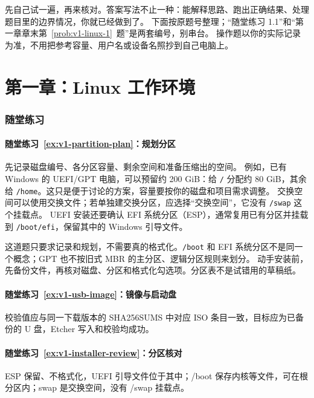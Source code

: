 \begingroup
\setlength{\emergencystretch}{3em}

先自己试一遍，再来核对。答案写法不止一种：能解释思路、跑出正确结果、处理题目里的边界情况，你就已经做到了。
下面按原题号整理；“随堂练习 1.1”和“第一章章末第~\ref{prob:v1-linux-1}~题”是两套编号，别串台。
操作题以你的实际记录为准，不用把参考容量、用户名或设备名照抄到自己电脑上。

\section*{第一章：Linux 工作环境}
{}
\subsubsection*{随堂练习}

\paragraph*{随堂练习~\ref{ex:v1-partition-plan}：规划分区}
\begin{solution}
先记录磁盘编号、各分区容量、剩余空间和准备压缩出的空间。
例如，已有 Windows 的 UEFI/GPT 电脑，可以预留约 200 GiB：给 \texttt{/} 分配约 80 GiB，其余给 \texttt{/home}。这只是便于讨论的方案，容量要按你的磁盘和项目需求调整。
交换空间可以使用交换文件；若单独建交换分区，应选择“交换空间”，它没有 \texttt{/swap} 这个挂载点。
UEFI 安装还要确认 EFI 系统分区（ESP），通常复用已有分区并挂载到 \texttt{/boot/efi}，保留其中的 Windows 引导文件。
\begin{note}
这道题只要求记录和规划，不需要真的格式化。\texttt{/boot} 和 EFI 系统分区不是同一个概念；GPT 也不按旧式 MBR 的主分区、逻辑分区规则来划分。
动手安装前，先备份文件，再核对磁盘、分区和格式化勾选项。分区表不是试错用的草稿纸。
\end{note}
\end{solution}

\paragraph*{随堂练习~\ref{ex:v1-usb-image}：镜像与启动盘}
\begin{solution}
校验值应与同一下载版本的 SHA256SUMS 中对应 ISO 条目一致，目标应为已备份的 U 盘，Etcher 写入和校验均成功。
\end{solution}
\paragraph*{随堂练习~\ref{ex:v1-installer-review}：分区核对}
\begin{solution}
ESP 保留、不格式化，UEFI 引导文件位于其中；/boot 保存内核等文件，可在根分区内；swap 是交换空间，没有 /swap 挂载点。
\end{solution}
